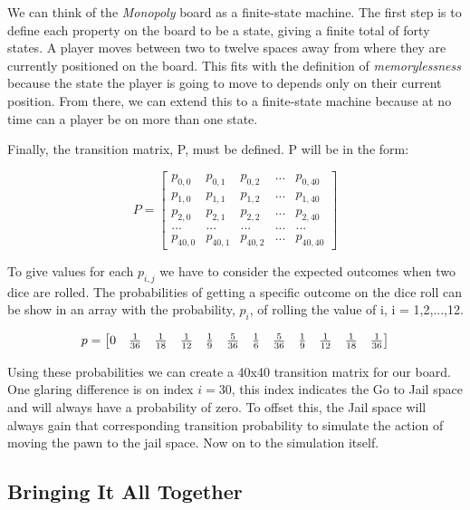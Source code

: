 \documentclass{article}
\begin{document}
We can think of the \textit{Monopoly} board as a finite-state machine.  The first step is to define each property on the board to be a state, giving a finite total of forty states.  A player moves between two to twelve spaces away from where they are currently positioned on the board.  This fits with the definition of \textit{memorylessness} because the state the player is going to move to depends only on their current position.  From there, we can extend this to a finite-state machine because at no time can a player be on more than one state.

Finally, the transition matrix, P, must be defined.  P will be in the form:

$$
P=
\begin{bmatrix}
p_{0,0} & p_{0,1} & p_{0,2} & ... & p_{0,40}\\
p_{1,0} & p_{1,1} & p_{1,2} & ... & p_{1,40}\\
p_{2,0} & p_{2,1} & p_{2,2} & ... & p_{2,40}\\
... & ... & ... & ... & ...\\
p_{40,0} & p_{40,1} & p_{40,2} & ... & p_{40,40}
\end{bmatrix}
$$

To give values for each $p_{i,j}$ we have to consider the expected outcomes when two dice are rolled.  The probabilities of getting a specific outcome on the dice roll can be show in an array with the probability, $p_i$, of rolling the value of i, i = 1,2,...,12.

$$
\setcounter{MaxMatrixCols}{20}
p=
\begin{bmatrix}
0&\frac{1}{36}&\frac{1}{18}&\frac{1}{12}&\frac{1}{9}&\frac{5}{36}&\frac{1}{6}&\frac{5}{36}&\frac{1}{9}&\frac{1}{12}&\frac{1}{18}&\frac{1}{36}\\
\end{bmatrix}
$$

Using these probabilities we can create a 40x40 transition matrix for our board.  One glaring difference is on index $i = 30$, this index indicates the Go to Jail space and will always have a probability of zero.  To offset this, the Jail space will always gain that corresponding transition probability to simulate the action of moving the pawn to the jail space.  Now on to the simulation itself.

\subsection{Bringing It All Together}
\end{document}
